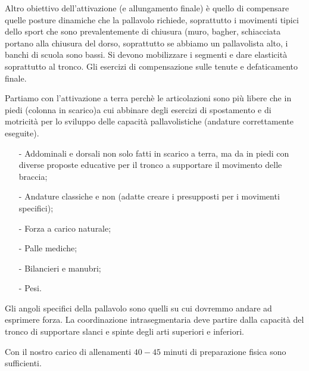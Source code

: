 Altro obiettivo dell'attivazione (e allungamento finale) è quello di compensare quelle posture
dinamiche che la pallavolo richiede, soprattutto i movimenti tipici dello sport che sono
prevalentemente di chiusura (muro, bagher, schiacciata portano alla chiusura del dorso,
soprattutto se abbiamo un pallavolista alto, i banchi di scuola sono bassi.
Si devono mobilizzare i segmenti e dare elasticità soprattutto al tronco.
Gli esercizi di compensazione sulle tenute e defaticamento finale.

Partiamo con l'attivazione a terra perchè le articolazioni sono più libere che in piedi (colonna in
scarico)a cui abbinare degli esercizi di spostamento e di motricità per lo sviluppo delle capacità
pallavolistiche (andature correttamente eseguite).
\begin{enumerate}
\item[-]Addominali e dorsali non solo fatti in scarico a terra, ma da in piedi con diverse proposte educative
per il tronco a supportare il movimento delle braccia;
\item[-]Andature classiche e non (adatte creare i presupposti per i movimenti specifici);
\item[-]Forza a carico naturale;
\item[-]Palle mediche;
\item[-]Bilancieri e manubri;
\item[-]Pesi.
\end{enumerate}

Gli angoli specifici della pallavolo sono quelli su cui dovremmo andare ad esprimere forza. La coordinazione
intrasegmentaria deve partire dalla capacità del tronco di supportare slanci e spinte degli arti superiori e
inferiori.

Con il nostro carico di allenamenti $40-45$ minuti di preparazione fisica sono sufficienti.

